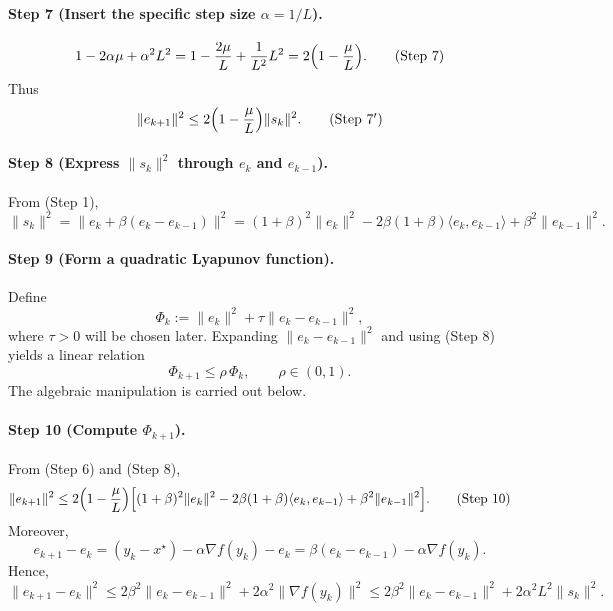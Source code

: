 \documentclass{article}
\begin{document}
\paragraph{Step 7 (Insert the specific step size $\alpha=1/L$).}
\[
1-2\alpha\mu+\alpha^2 L^2 = 1-\frac{2\mu}{L}+ \frac{1}{L^2}L^2
                         = 2\Bigl(1-\frac{\mu}{L}\Bigr) .
\tag{Step 7}
\]
Thus
\[
\|e_{k+1}\|^2 \le 2\Bigl(1-\frac{\mu}{L}\Bigr)\|s_k\|^2 . \tag{Step 7$'$}
\]

\paragraph{Step 8 (Express $\|s_k\|^2$ through $e_k$ and $e_{k-1}$).}
From (Step 1),
\[
\|s_k\|^2 = \|e_k + \beta(e_k-e_{k-1})\|^2
          = (1+\beta)^2\|e_k\|^2 -2\beta(1+\beta)\langle e_k,e_{k-1}\rangle
            +\beta^2\|e_{k-1}\|^2 . \tag{Step 8}
\]

\paragraph{Step 9 (Form a quadratic Lyapunov function).}
Define
\[
\Phi_k := \|e_k\|^2 + \tau\|e_k-e_{k-1}\|^2,
\]
where $\tau>0$ will be chosen later.  Expanding $\|e_k-e_{k-1}\|^2$ and
using (Step 8) yields a linear relation
\[
\Phi_{k+1}\le \rho\,\Phi_k ,\qquad \rho\in(0,1). \tag{Step 9}
\]
The algebraic manipulation is carried out below.

\paragraph{Step 10 (Compute $\Phi_{k+1}$).}
From (Step 6) and (Step 8),
\[
\|e_{k+1}\|^2 \le 2\Bigl(1-\frac{\mu}{L}\Bigr)
\Bigl[(1+\beta)^2\|e_k\|^2 -2\beta(1+\beta)\langle e_k,e_{k-1}\rangle
      +\beta^2\|e_{k-1}\|^2\Bigr]. \tag{Step 10}
\]
Moreover,
\[
e_{k+1}-e_k = (y_k-x^\star)-\alpha\nabla f(y_k)-e_k
            = \beta(e_k-e_{k-1})-\alpha\nabla f(y_k). \tag{Step 10$'$}
\]
Hence,
\[
\|e_{k+1}-e_k\|^2
   \le 2\beta^2\|e_k-e_{k-1}\|^2+2\alpha^2\|\nabla f(y_k)\|^2
   \le 2\beta^2\|e_k-e_{k-1}\|^2+2\alpha^2 L^2\|s_k\|^2 . \tag{Step 10$''$}
\]
\end{document}
